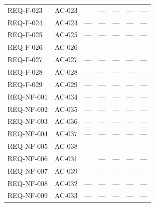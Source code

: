 \begin{longtable}{L{2.0cm} L{1.8cm} L{2.8cm} L{1.6cm} L{1.6cm} L{1.6cm} L{1.6cm}}
REQ-F-023 & AC-023 &      & --- & --- & --- & --- \\
REQ-F-024 & AC-024 & ---                          & --- & --- & --- & --- \\
REQ-F-025 & AC-025 & ---                          & --- & --- & --- & --- \\
REQ-F-026 & AC-026 & ---                          & --- & --- & --- & --- \\
REQ-F-027 & AC-027 & ---                          & --- & --- & --- & --- \\
REQ-F-028 & AC-028 & ---                          & --- & --- & --- & --- \\
REQ-F-029 & AC-029 & ---                          & --- & --- & --- & --- \\
REQ-NF-001 & AC-034 & ---                         & --- & --- & --- & --- \\
REQ-NF-002 & AC-035 & ---                         & --- & --- & --- & --- \\
REQ-NF-003 & AC-036 & ---                         & --- & --- & --- & --- \\
REQ-NF-004 & AC-037 & ---                         & --- & --- & --- & --- \\
REQ-NF-005 & AC-038 & ---                         & --- & --- & --- & --- \\
REQ-NF-006 & AC-031 &  & --- & --- & --- & --- \\
REQ-NF-007 & AC-039 & ---                         & --- & --- & --- & --- \\
REQ-NF-008 & AC-032 & ---                         & --- & --- & --- & --- \\
REQ-NF-009 & AC-033 & ---                         & --- & --- & --- & --- \\

\end{longtable}
